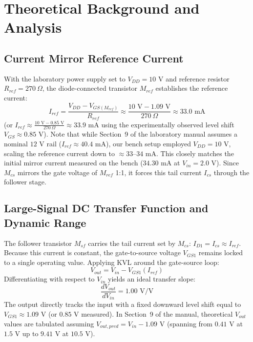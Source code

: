 \documentclass[11pt, a4paper]{article}
\begin{document}
\section{Theoretical Background and Analysis}

\subsection{Current Mirror Reference Current}
With the laboratory power supply set to $V_{DD} = 10\text{ V}$ and reference resistor $R_{ref} = 270\ \Omega$, the diode-connected transistor $M_{ref}$ establishes the reference current:
\begin{equation}
I_{ref} = \frac{V_{DD} - V_{GS(M_{ref})}}{R_{ref}} \approx \frac{10\text{ V} - 1.09\text{ V}}{270\ \Omega} \approx 33.0\text{ mA}
\end{equation}
(or $I_{ref} \approx \frac{10\text{ V} - 0.85\text{ V}}{270\ \Omega} \approx 33.9\text{ mA}$ using the experimentally observed level shift $V_{GS} \approx 0.85\text{ V}$). Note that while Section~9 of the laboratory manual assumes a nominal $12\text{ V}$ rail ($I_{ref} \approx 40.4\text{ mA}$), our bench setup employed $V_{DD} = 10\text{ V}$, scaling the reference current down to $\approx 33\text{--}34\text{ mA}$. This closely matches the initial mirror current measured on the bench ($34.30\text{ mA}$ at $V_{in} = 2.0\text{ V}$). Since $M_{cs}$ mirrors the gate voltage of $M_{ref}$ 1:1, it forces this tail current $I_{cs}$ through the follower stage.

\subsection{Large-Signal DC Transfer Function and Dynamic Range}
The follower transistor $M_{sf}$ carries the tail current set by $M_{cs}$: $I_{D1} = I_{cs} \approx I_{ref}$. Because this current is constant, the gate-to-source voltage $V_{GS1}$ remains locked to a single operating value. Applying KVL around the gate-source loop:
\begin{equation}
V_{out} = V_{in} - V_{GS1}(I_{ref})
\end{equation}
Differentiating with respect to $V_{in}$ yields an ideal transfer slope:
\begin{equation}
\frac{dV_{out}}{dV_{in}} = 1.00\text{ V/V}
\end{equation}
The output directly tracks the input with a fixed downward level shift equal to $V_{GS1} \approx 1.09\text{ V}$ (or $0.85\text{ V}$ measured). In Section~9 of the manual, theoretical $V_{out}$ values are tabulated assuming $V_{out,pred} = V_{in} - 1.09\text{ V}$ (spanning from $0.41\text{ V}$ at $1.5\text{ V}$ up to $9.41\text{ V}$ at $10.5\text{ V}$).
\end{document}
